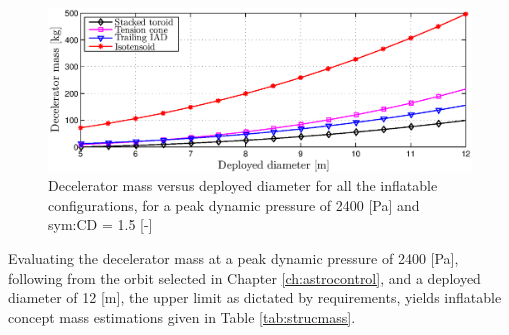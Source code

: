 

\begin{figure}[H]
\includegraphics[width = 1.0\textwidth]{Figure/mass_dia_2300qmax.eps}
\caption{Decelerator mass versus deployed diameter for all the inflatable configurations, for a peak dynamic pressure of 2400 [Pa] and \gls{sym:CD} = 1.5 [-]}
\label{fig:mass_dia}
\end{figure}

Evaluating the decelerator mass at a peak dynamic pressure of 2400 [Pa], following from the orbit selected in Chapter \ref{ch:astrocontrol}, and a deployed diameter of 12 [m], the upper limit as dictated by requirements, yields inflatable concept mass estimations given in Table \ref{tab:strucmass}. 

